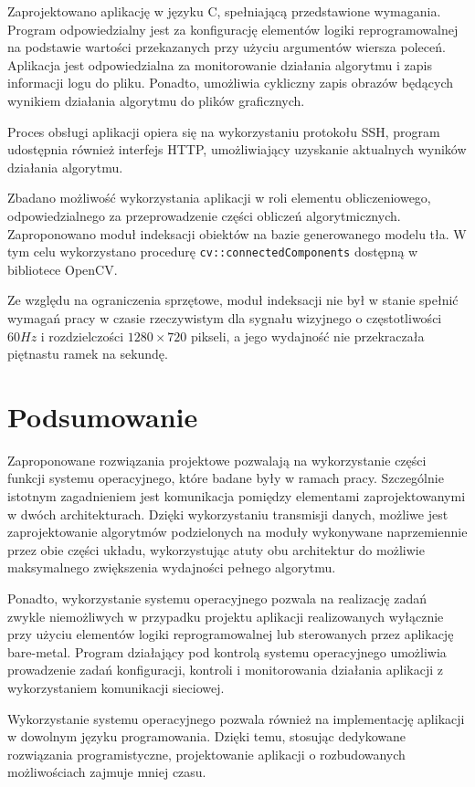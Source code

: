 Zaprojektowano aplikację w języku C, spełniającą przedstawione wymagania.
Program odpowiedzialny jest za konfigurację elementów logiki reprogramowalnej na podstawie wartości przekazanych przy użyciu argumentów wiersza poleceń. Aplikacja jest odpowiedzialna za monitorowanie działania algorytmu i zapis informacji logu do pliku. Ponadto, umożliwia cykliczny zapis obrazów będących wynikiem działania algorytmu do plików graficznych. 

Proces obsługi aplikacji opiera się na wykorzystaniu protokołu SSH, program udostępnia również interfejs HTTP, umożliwiający uzyskanie aktualnych wyników działania algorytmu.

Zbadano możliwość wykorzystania aplikacji w roli elementu obliczeniowego, odpowiedzialnego za przeprowadzenie części obliczeń algorytmicznych. Zaproponowano moduł indeksacji obiektów na bazie generowanego modelu tła. W tym celu wykorzystano procedurę \texttt{cv::connectedComponents} dostępną w bibliotece OpenCV. 

Ze względu na ograniczenia sprzętowe, moduł indeksacji nie był w stanie spełnić wymagań pracy w czasie rzeczywistym dla sygnału wizyjnego o częstotliwości $60Hz$ i rozdzielczości $1280 \times 720 $ pikseli, a jego wydajność nie przekraczała piętnastu ramek na sekundę.

\section*{Podsumowanie}
Zaproponowane rozwiązania projektowe pozwalają na wykorzystanie części funkcji systemu operacyjnego, które badane były w ramach pracy. Szczególnie istotnym zagadnieniem jest komunikacja pomiędzy elementami zaprojektowanymi w dwóch architekturach. Dzięki wykorzystaniu transmisji danych, możliwe jest zaprojektowanie algorytmów podzielonych na moduły wykonywane naprzemiennie przez obie części układu, wykorzystując atuty obu architektur do możliwie maksymalnego zwiększenia wydajności pełnego algorytmu.

Ponadto, wykorzystanie systemu operacyjnego pozwala na realizację zadań zwykle niemożliwych w przypadku projektu aplikacji realizowanych wyłącznie przy użyciu elementów logiki reprogramowalnej lub sterowanych przez aplikację bare-metal. Program działający pod kontrolą systemu operacyjnego umożliwia prowadzenie zadań konfiguracji, kontroli i monitorowania działania aplikacji z wykorzystaniem komunikacji sieciowej.

Wykorzystanie systemu operacyjnego pozwala również na implementację aplikacji w dowolnym języku programowania. Dzięki temu, stosując dedykowane rozwiązania programistyczne, projektowanie aplikacji o rozbudowanych możliwościach zajmuje mniej czasu.

